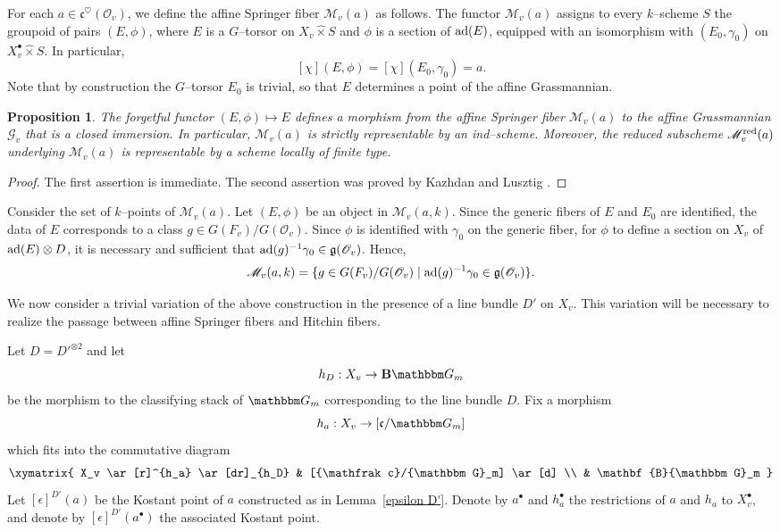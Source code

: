 \documentclass[12pt,english]{smfart}
\numberwithin{equation}{subsection}
\newtheorem{proposition}[equation]{Proposition}
\theoremstyle{remark}
\newcommand\calM{{\mathscr M}}
\newcommand\calO{{\mathscr O}}
\newcommand\calQ{{\mathscr G}} %
\newcommand\calG{{\mathscr G}}
\newcommand\frakg{{\mathfrak g}}
\newcommand\frakc{{\mathfrak c}}
\newcommand\GG{{\mathbbm G}}
\newcommand\ad{{\rm ad}}
\begin{document}
For each $a\in\frakc^\heartsuit(\calO_v)$, we define the affine Springer fiber $\calM_v(a)$ as follows. The functor $\calM_v(a)$ assigns to every $k$--scheme $S$ the groupoid of pairs $(E,\phi)$, where $E$ is a $G$--torsor on $X_v\hat\times S$ and $\phi$ is a section of $\ad(E)$, equipped with an isomorphism with $(E_0,\gamma_0)$ on $X_v^\bullet\hat\times S$. In particular,
$$
[\chi](E,\phi)=[\chi](E_0,\gamma_0)=a.
$$
Note that by construction the $G$--torsor $E_0$ is trivial, so that $E$ determines a point of the affine Grassmannian.

\begin{proposition}\label{localement de type fini}
The forgetful functor $(E,\phi)\mapsto E$ defines a morphism from the affine Springer fiber $\calM_v(a)$ to the affine Grassmannian $\calQ_v$ that is a closed immersion. In particular, $\calM_v(a)$ is strictly representable by an ind--scheme. Moreover, the reduced subscheme $\calM_v^{\rm red}(a)$ underlying $\calM_v(a)$ is representable by a scheme locally of finite type.
\end{proposition}

\begin{proof}
The first assertion is immediate. The second assertion was proved by Kazhdan and Lusztig \cite{KL}.
\end{proof}

Consider the set of $k$--points of $\calM_v(a)$. Let $(E,\phi)$ be an object in $\calM_v(a,k)$. Since the generic fibers of $E$ and $E_0$ are identified, the data of $E$ corresponds to a class $g\in G(F_v)/G(\calO_v)$. Since $\phi$ is identified with $\gamma_0$ on the generic fiber, for $\phi$ to define a section on $X_v$ of $\ad(E)\otimes D$, it is necessary and sufficient that $\ad(g)^{-1}\gamma_0 \in \frakg(\calO_v)$. Hence,
$$
\calM_v(a,k)=\{g\in G(F_v)/G(\calO_v) \mid \ad(g)^{-1}\gamma_0 \in \frakg(\calO_v)\}.
$$

We now consider a trivial variation of the above construction in the presence of a line bundle $D'$ on $X_v$. This variation will be necessary to realize the passage between affine Springer fibers and Hitchin fibers.

Let $D={D'}^{\otimes 2}$ and let 
$$
h_D:X_v\to \mathbf{B}\GG_m
$$
be the morphism to the classifying stack of $\GG_m$ corresponding to the line bundle $D$. Fix a morphism
$$
h_a:X_v\to [\frakc/\GG_m]
$$
which fits into the commutative diagram
$$
\xymatrix{
  X_v \ar[r]^{h_a} \ar[dr]_{h_D} & [\frakc/\GG_m] \ar[d] \\
  & \mathbf{B}\GG_m
}
$$
Let $[\epsilon]^{D'}(a)$ be the Kostant point of $a$ constructed as in Lemma~\ref{epsilon D'}. Denote by $a^\bullet$ and $h_a^\bullet$ the restrictions of $a$ and $h_a$ to $X_v^\bullet$, and denote by $[\epsilon]^{D'}(a^\bullet)$ the associated Kostant point.
 
\end{document}
